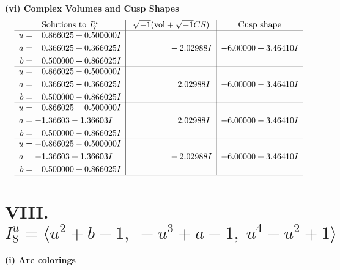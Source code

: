 \documentclass[1p]{elsarticle_modified}
\theoremstyle{definition}
\newcommand{\I}{\sqrt{-1}}
\begin{document}
\newpage\flushleft \textbf{(vi) Complex Volumes and Cusp Shapes}
$$\begin{array}{c|c|c}  
\text{Solutions to }I^u_{7}& \I (\text{vol} + \sqrt{-1}CS) & \text{Cusp shape}\\
 \hline 
\begin{aligned}
u &= \phantom{-}0.866025 + 0.500000 I \\
a &= \phantom{-}0.366025 + 0.366025 I \\
b &= \phantom{-}0.500000 + 0.866025 I\end{aligned}
 & \phantom{-0.000000 } -2.02988 I & -6.00000 + 3.46410 I \\ \hline\begin{aligned}
u &= \phantom{-}0.866025 - 0.500000 I \\
a &= \phantom{-}0.366025 - 0.366025 I \\
b &= \phantom{-}0.500000 - 0.866025 I\end{aligned}
 & \phantom{-0.000000 -}2.02988 I & -6.00000 - 3.46410 I \\ \hline\begin{aligned}
u &= -0.866025 + 0.500000 I \\
a &= -1.36603 - 1.36603 I \\
b &= \phantom{-}0.500000 - 0.866025 I\end{aligned}
 & \phantom{-0.000000 -}2.02988 I & -6.00000 - 3.46410 I \\ \hline\begin{aligned}
u &= -0.866025 - 0.500000 I \\
a &= -1.36603 + 1.36603 I \\
b &= \phantom{-}0.500000 + 0.866025 I\end{aligned}
 & \phantom{-0.000000 } -2.02988 I & -6.00000 + 3.46410 I\\
 \hline 
 \end{array}$$\newpage\newpage\renewcommand{\arraystretch}{1}
\centering \section*{VIII. $I^u_{8}= \langle u^2+b-1,\;- u^3+a-1,\;u^4- u^2+1 \rangle$}
\flushleft \textbf{(i) Arc colorings}\\
\end{document}
